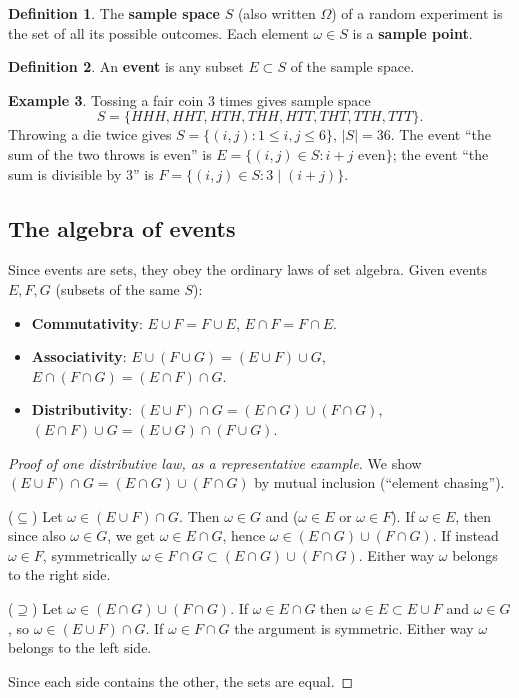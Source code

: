 \documentclass[11pt]{article}
\theoremstyle{definition}
\newtheorem{definition}{Definition}[section]
\newtheorem{example}[definition]{Example}
\theoremstyle{plain}
\theoremstyle{remark}
\begin{document}
\begin{definition}
The \textbf{sample space} $S$ (also written $\Omega$) of a random experiment is the set of all
its possible outcomes. Each element $\omega \in S$ is a \textbf{sample point}.
\end{definition}

\begin{definition}
An \textbf{event} is any subset $E \subset S$ of the sample space.
\end{definition}

\begin{example}
Tossing a fair coin $3$ times gives sample space
\[
S = \{HHH, HHT, HTH, THH, HTT, THT, TTH, TTT\}.
\]
Throwing a die twice gives $S = \{(i,j) : 1 \le i,j \le 6\}$, $|S|=36$.
The event ``the sum of the two throws is even'' is
$E = \{(i,j) \in S : i+j \text{ even}\}$; the event ``the sum is divisible by $3$'' is
$F = \{(i,j)\in S : 3 \mid (i+j)\}$.
\end{example}

\subsection{The algebra of events}

Since events are sets, they obey the ordinary laws of set algebra. Given events $E,F,G$ (subsets
of the same $S$):
\begin{itemize}[leftmargin=1.6em]
\item \textbf{Commutativity}: $E \cup F = F \cup E$, \quad $E \cap F = F \cap E$.
\item \textbf{Associativity}: $E \cup (F \cup G) = (E \cup F) \cup G$, \quad
$E \cap (F \cap G) = (E \cap F) \cap G$.
\item \textbf{Distributivity}: $(E\cup F)\cap G = (E\cap G)\cup(F\cap G)$, \quad
$(E\cap F)\cup G = (E \cup G) \cap (F \cup G)$.
\end{itemize}

\begin{proof}[Proof of one distributive law, as a representative example]
We show $(E \cup F)\cap G = (E \cap G) \cup (F \cap G)$ by mutual inclusion (``element chasing'').

($\subseteq$) Let $\omega \in (E\cup F)\cap G$. Then $\omega \in G$ and ($\omega \in E$ or
$\omega \in F$). If $\omega \in E$, then since also $\omega \in G$, we get $\omega \in E \cap G$,
hence $\omega \in (E\cap G)\cup(F\cap G)$. If instead $\omega \in F$, symmetrically
$\omega \in F \cap G \subset (E\cap G)\cup(F\cap G)$. Either way $\omega$ belongs to the right side.

($\supseteq$) Let $\omega \in (E\cap G)\cup(F\cap G)$. If $\omega \in E \cap G$ then $\omega \in E
\subset E \cup F$ and $\omega \in G$, so $\omega \in (E\cup F)\cap G$. If $\omega \in F \cap G$ the
argument is symmetric. Either way $\omega$ belongs to the left side.

Since each side contains the other, the sets are equal.
\end{proof}
\end{document}
